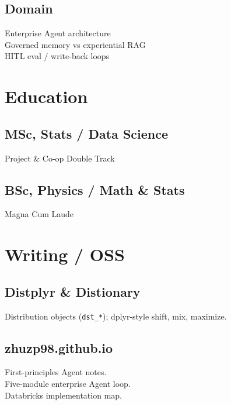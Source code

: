 \documentclass[letterpaper]{deedy-resume}
\begin{document}
\begin{minipage}[t]{0.33\textwidth}
\sectionspace

\subsection{Domain}
Enterprise Agent architecture \\
Governed memory vs experiential RAG \\
HITL eval / write-back loops

\sectionspace

\section{Education}
\vspace{1mm}

\subsection{MSc, Stats / Data Science}
Project \& Co-op Double Track

\sectionspace

\subsection{BSc, Physics / Math \& Stats}
Magna Cum Laude

\sectionspace

\section{Writing / OSS}
\vspace{1mm}
\subsection{Distplyr \& Distionary}
Distribution objects (\texttt{dst\_*}); dplyr-style shift, mix, maximize.

\sectionspace

\subsection{zhuzp98.github.io}
First-principles Agent notes. \\
Five-module enterprise Agent loop. \\
Databricks implementation map.

\end{minipage}
\end{document}
